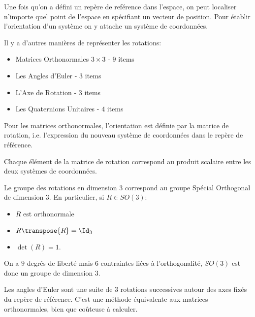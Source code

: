 \documentclass[math]{cours}
\begin{document}
\begin{definition}
	Une fois qu'on a défini un repère de reférence dans l'espace, on peut localiser n'importe quel point de l'espace en spécifiant un vecteur de position.
	Pour établir l'orientation d'un système on y attache un système de coordonnées.
\end{definition}

Il y a d'autres manières de représenter les rotations:
\begin{itemize}
	\item Matrices Orthonormales $3\times 3$ - $9$ items
	\item Les Angles d'Euler - $3$ items
	\item L'Axe de Rotation - $3$ items
	\item Les Quaternions Unitaires - $4$ items
\end{itemize}

\begin{definition}
	Pour les matrices orthonormales, l'orientation est définie par la matrice de rotation, i.e. l'expression du nouveau système de coordonnées dans le repère de référence.
	\label{def:rotationmatrix}
\end{definition}

\begin{proposition}
	Chaque élément de la matrice de rotation correspond au produit scalaire entre les deux systèmes de coordonnées.
\end{proposition}
\begin{proposition}
	Le groupe des rotations en dimension $3$ correspond au groupe Spécial Orthogonal de dimension $3$.
	En particulier, si $R \in SO(3)$:
	\begin{itemize}
		\item $R$ est orthonormale
		\item $R\transpose{R} = \Id_{3}$
		\item $\det(R) = 1$.
	\end{itemize}
	On a $9$ degrés de liberté mais $6$ contraintes liées à l'orthogonalité, $SO(3)$ est donc un groupe de dimension $3$.
\end{proposition}

\begin{definition}
	Les angles d'Euler sont une suite de $3$ rotations successives autour des axes fixés du repère de référence.
	C'est une méthode équivalente aux matrices orthonormales, bien que coûteuse à calculer.
	\label{def:eulerangles}
\end{definition}
\end{document}
